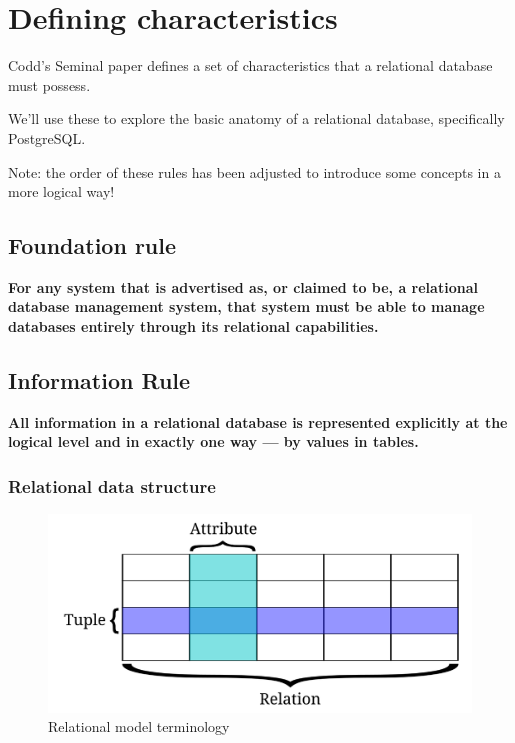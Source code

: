 \documentclass[slides]{pgnotes}
\begin{document}
\section{Defining characteristics}

Codd's Seminal paper defines a set of characteristics that a relational database must possess.

We'll use these to explore the basic anatomy of a relational database, specifically PostgreSQL.

Note: the order of these rules has been adjusted to introduce some concepts in a more logical way!


\subsection{Foundation rule}

\textbf{For any system that is advertised as, or claimed to be, a relational database management system, that system must be able to manage databases entirely through its relational capabilities.}
  
\subsection{Information Rule}
  
\textbf{All information in a relational database is represented explicitly at the logical level and in exactly one way --- by values in tables.}

\subsubsection{Relational data structure}

\begin{figure}[htbp]
  \centering
  \includegraphics[width=0.5\linewidth]{rdbms_terms}
  \caption{Relational model terminology}
  \label{fig:rdbms-terms}
\end{figure}
\end{document}
